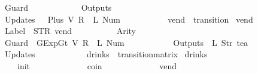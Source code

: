\begin{isabellebody}
{\ \ \ \ \ \ \ \ \ \ Guard\ {\isacharequal}\ {\isacharbrackleft}{\isacharbrackright}{\isacharcomma}\isanewline
\ \ \ \ \ \ \ \ \ \ Outputs\ {\isacharequal}\ {\isacharbrackleft}{\isacharbrackright}{\isacharcomma}\isanewline
\ \ \ \ \ \ \ \ \ \ Updates\ {\isacharequal}\ {\isacharbrackleft}{\isacharparenleft}{}{\isacharcomma}\ {\isacharparenleft}Plus\ {\isacharparenleft}V\ {\isacharparenleft}R\ {}{\isacharparenright}{\isacharparenright}\ {\isacharparenleft}L\ {\isacharparenleft}Num\ {}{\isacharparenright}{\isacharparenright}{\isacharparenright}{\isacharparenright}{\isacharbrackright}\isanewline
\ \ \ \ \ \ \ \ {\isasymrparr}{\isachardoublequoteclose}\isanewline
\isanewline
{}\isamarkupfalse%
\ vend\ {\isacharcolon}{\isacharcolon}\ transition\ \isanewline
{\isachardoublequoteopen}vend\ {\isasymequiv}\ {\isasymlparr}\isanewline
\ \ \ \ \ \ \ \ \ \ Label\ {\isacharequal}\ {\isacharparenleft}STR\ {\isacharprime}{\isacharprime}vend{\isacharprime}{\isacharprime}{\isacharparenright}{\isacharcomma}\isanewline
\ \ \ \ \ \ \ \ \ \ Arity\ {\isacharequal}\ {}{\isacharcomma}\isanewline
\ \ \ \ \ \ \ \ \ \ Guard\ {\isacharequal}\ {\isacharbrackleft}GExp{\isachardot}Gt\ {\isacharparenleft}V\ {\isacharparenleft}R\ {}{\isacharparenright}{\isacharparenright}\ {\isacharparenleft}L\ {\isacharparenleft}Num\ {}{\isacharparenright}{\isacharparenright}{\isacharbrackright}{\isacharcomma}\isanewline
\ \ \ \ \ \ \ \ \ \ Outputs\ {\isacharequal}\ {\isacharbrackleft}L\ {\isacharparenleft}Str\ {\isacharprime}{\isacharprime}tea{\isacharprime}{\isacharprime}{\isacharparenright}{\isacharbrackright}{\isacharcomma}\isanewline
\ \ \ \ \ \ \ \ \ \ Updates\ {\isacharequal}\ {\isacharbrackleft}{\isacharbrackright}\isanewline
\ \ \ \ \ \ \ \ {\isasymrparr}{\isachardoublequoteclose}\isanewline
\isanewline
{}\isamarkupfalse%
\ drinks\ {\isacharcolon}{\isacharcolon}\ {\isachardoublequoteopen}transition{\isacharunderscore}matrix{\isachardoublequoteclose}\ \isanewline
{\isachardoublequoteopen}drinks\ {\isasymequiv}\ {\isacharbraceleft}{\isacharbar}\isanewline
\ \ \ \ \ \ \ \ \ \ \ \ {\isacharparenleft}{\isacharparenleft}{}{\isacharcomma}{}{\isacharparenright}{\isacharcomma}\ init{\isacharparenright}{\isacharcomma}\isanewline
\ \ \ \ \ \ \ \ \ \ \ \ {\isacharparenleft}{\isacharparenleft}{}{\isacharcomma}{}{\isacharparenright}{\isacharcomma}\ coin{\isacharparenright}{\isacharcomma}\isanewline
\ \ \ \ \ \ \ \ \ \ \ \ {\isacharparenleft}{\isacharparenleft}{}{\isacharcomma}{}{\isacharparenright}{\isacharcomma}\ vend{\isacharparenright}\isanewline
}
\end{isabellebody}
